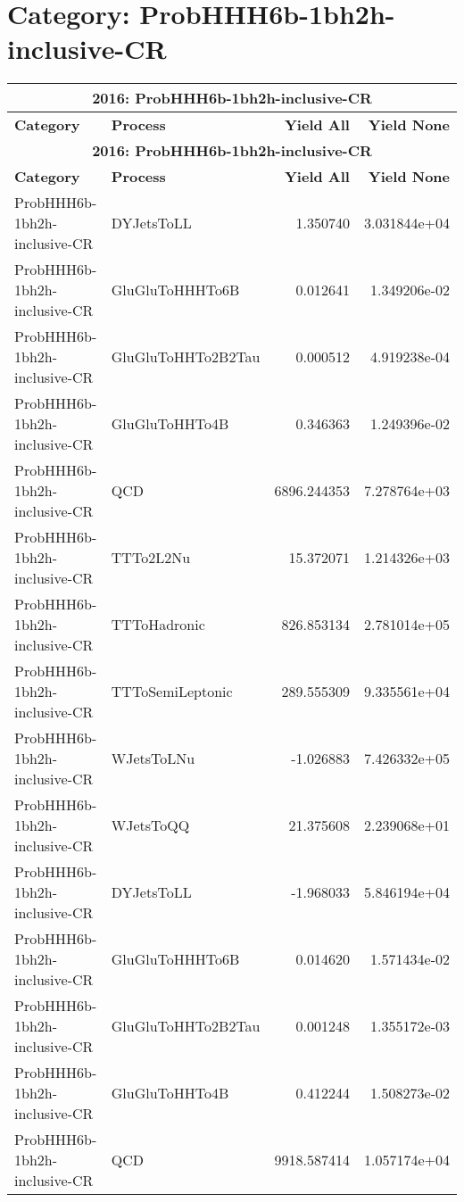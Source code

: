 \section*{Category: ProbHHH6b-1bh2h-inclusive-CR}
\begin{longtable}[c]{|l|l|r|r|}
\hline
\multicolumn{4}{|c|}{\textbf{2016: ProbHHH6b-1bh2h-inclusive-CR}} \\
\hline
\textbf{Category} & \textbf{Process} & \textbf{Yield All} & \textbf{Yield None} \\
\hline
\endfirsthead
\hline
\multicolumn{4}{|c|}{\textbf{2016: ProbHHH6b-1bh2h-inclusive-CR}} \\
\hline
\textbf{Category} & \textbf{Process} & \textbf{Yield All} & \textbf{Yield None} \\
\hline
\endhead
ProbHHH6b-1bh2h-inclusive-CR & DYJetsToLL & 1.350740 & 3.031844e+04 \\
\hline
ProbHHH6b-1bh2h-inclusive-CR & GluGluToHHHTo6B & 0.012641 & 1.349206e-02 \\
\hline
ProbHHH6b-1bh2h-inclusive-CR & GluGluToHHTo2B2Tau & 0.000512 & 4.919238e-04 \\
\hline
ProbHHH6b-1bh2h-inclusive-CR & GluGluToHHTo4B & 0.346363 & 1.249396e-02 \\
\hline
ProbHHH6b-1bh2h-inclusive-CR & QCD & 6896.244353 & 7.278764e+03 \\
\hline
ProbHHH6b-1bh2h-inclusive-CR & TTTo2L2Nu & 15.372071 & 1.214326e+03 \\
\hline
ProbHHH6b-1bh2h-inclusive-CR & TTToHadronic & 826.853134 & 2.781014e+05 \\
\hline
ProbHHH6b-1bh2h-inclusive-CR & TTToSemiLeptonic & 289.555309 & 9.335561e+04 \\
\hline
ProbHHH6b-1bh2h-inclusive-CR & WJetsToLNu & -1.026883 & 7.426332e+05 \\
\hline
ProbHHH6b-1bh2h-inclusive-CR & WJetsToQQ & 21.375608 & 2.239068e+01 \\
\hline
ProbHHH6b-1bh2h-inclusive-CR & DYJetsToLL & -1.968033 & 5.846194e+04 \\
\hline
ProbHHH6b-1bh2h-inclusive-CR & GluGluToHHHTo6B & 0.014620 & 1.571434e-02 \\
\hline
ProbHHH6b-1bh2h-inclusive-CR & GluGluToHHTo2B2Tau & 0.001248 & 1.355172e-03 \\
\hline
ProbHHH6b-1bh2h-inclusive-CR & GluGluToHHTo4B & 0.412244 & 1.508273e-02 \\
\hline
ProbHHH6b-1bh2h-inclusive-CR & QCD & 9918.587414 & 1.057174e+04 \\

\end{longtable}
